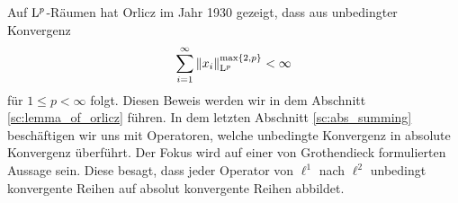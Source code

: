 Auf $ \mathrm{L}^p $-Räumen hat Orlicz\cite{Orlicz1930} im Jahr 1930 gezeigt, dass aus unbedingter Konvergenz
\begin{align*}
	\sum \limits_{i = 1}^\infty \|x_i\|^{\max\{2,p\}}_{\mathrm{L}^p} < \infty
\end{align*}
für $ 1 \leq p < \infty  $ folgt. Diesen Beweis werden wir in dem Abschnitt \ref{sc:lemma_of_orlicz} führen. In dem letzten Abschnitt \ref{sc:abs_summing} beschäftigen wir uns mit Operatoren, welche unbedingte Konvergenz in absolute Konvergenz überführt.
Der Fokus wird auf einer von Grothendieck\cite{Grothendieck1956} formulierten Aussage sein. Diese besagt, dass jeder Operator von $ \ell^1  $ nach $ \ell^2 $ unbedingt konvergente Reihen auf absolut konvergente Reihen abbildet.










